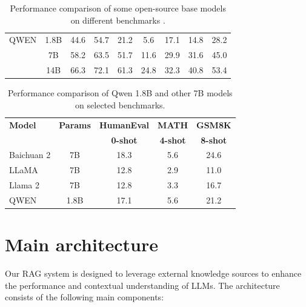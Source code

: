 \begin{table}[ht]
\begin{tabular}{l c c c c c c c c}
QWEN                & 1.8B           & 44.6           & 54.7           & 21.2           & 5.6           & 17.1               & 14.8          & 28.2          \\
                    & 7B             & 58.2           & 63.5           & 51.7           & 11.6          & 29.9               & 31.6          & 45.0          \\
                    & 14B            & 66.3           & 72.1           & 61.3           & 24.8          & 32.3               & 40.8          & 53.4          \\ \hline
\end{tabular}
\caption{Performance comparison of some open-source base models on different benchmarks \cite{bai2023qwen}.}
\label{table:qwen}
\end{table}

\begin{table}[ht]
	\centering
	\begin{tabular}{l c c c c}
		\hline
		\textbf{Model}      & \textbf{Params} & \textbf{HumanEval} & \textbf{MATH} & \textbf{GSM8K} \\ 
		&                 & \textbf{0-shot}    & \textbf{4-shot} & \textbf{8-shot} \\ \hline
		Baichuan 2 \cite{baichuan2}           & 7B             & 18.3               & 5.6           & 24.6           \\ \hline
		LLaMA \cite{llama}               & 7B             & 12.8               & 2.9           & 11.0           \\ \hline
		Llama 2 \cite{llama2}           & 7B             & 12.8               & 3.3           & 16.7           \\ \hline
		QWEN \cite{bai2023qwen}               & 1.8B           & 17.1               & 5.6           & 21.2           \\
		\hline
	\end{tabular}
	\caption{Performance comparison of Qwen 1.8B and other 7B models on selected benchmarks.}
	\label{table:qwen_filtered}
\end{table}

\section{Main architecture}

Our RAG system is designed to leverage external knowledge sources to enhance the performance and contextual understanding of LLMs. The architecture consists of the following main components:

